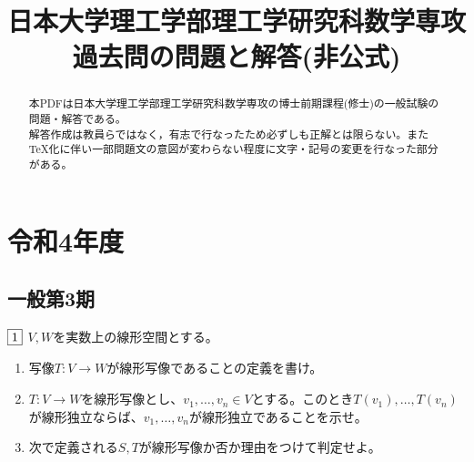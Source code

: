 \documentclass[dvipdfmx]{jsreport}
\title{日本大学理工学部理工学研究科数学専攻 過去問の問題と解答(非公式)}
\date{} %
\begin{document}
\maketitle %

\begin{abstract} %
	本PDFは日本大学理工学部理工学研究科数学専攻の博士前期課程(修士)の一般試験の問題・解答である。\\
	解答作成は教員らではなく，有志で行なったため必ずしも正解とは限らない。また\TeX 化に伴い一部問題文の意図が変わらない程度に文字・記号の変更を行なった部分がある。
\end{abstract}

\tableofcontents %


\chapter{令和4年度}
\section{一般第3期}
\begin{tcolorbox} %
	$\fbox{1}$ $V, W$を実数上の線形空間とする。
\begin{enumerate}
	\item 写像$T\colon V\to W$が線形写像であることの定義を書け。
	\item $T\colon V\to W$を線形写像とし、$v_1, \ldots, v_n\in V$とする。このとき$T(v_1), \ldots, T(v_n)$が線形独立ならば、$v_1, \ldots, v_n$が線形独立であることを示せ。
	\item 次で定義される$S, T$が線形写像か否か理由をつけて判定せよ。
\end{enumerate}
\end{tcolorbox}
\end{document}
